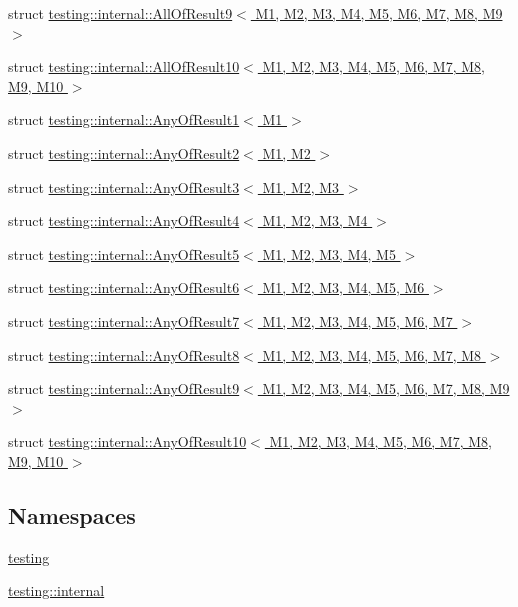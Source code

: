 \begin{DoxyCompactItemize}
\item 
struct \hyperlink{structtesting_1_1internal_1_1AllOfResult9}{testing\+::internal\+::\+All\+Of\+Result9$<$ M1, M2, M3, M4, M5, M6, M7, M8, M9 $>$}
\item 
struct \hyperlink{structtesting_1_1internal_1_1AllOfResult10}{testing\+::internal\+::\+All\+Of\+Result10$<$ M1, M2, M3, M4, M5, M6, M7, M8, M9, M10 $>$}
\item 
struct \hyperlink{structtesting_1_1internal_1_1AnyOfResult1}{testing\+::internal\+::\+Any\+Of\+Result1$<$ M1 $>$}
\item 
struct \hyperlink{structtesting_1_1internal_1_1AnyOfResult2}{testing\+::internal\+::\+Any\+Of\+Result2$<$ M1, M2 $>$}
\item 
struct \hyperlink{structtesting_1_1internal_1_1AnyOfResult3}{testing\+::internal\+::\+Any\+Of\+Result3$<$ M1, M2, M3 $>$}
\item 
struct \hyperlink{structtesting_1_1internal_1_1AnyOfResult4}{testing\+::internal\+::\+Any\+Of\+Result4$<$ M1, M2, M3, M4 $>$}
\item 
struct \hyperlink{structtesting_1_1internal_1_1AnyOfResult5}{testing\+::internal\+::\+Any\+Of\+Result5$<$ M1, M2, M3, M4, M5 $>$}
\item 
struct \hyperlink{structtesting_1_1internal_1_1AnyOfResult6}{testing\+::internal\+::\+Any\+Of\+Result6$<$ M1, M2, M3, M4, M5, M6 $>$}
\item 
struct \hyperlink{structtesting_1_1internal_1_1AnyOfResult7}{testing\+::internal\+::\+Any\+Of\+Result7$<$ M1, M2, M3, M4, M5, M6, M7 $>$}
\item 
struct \hyperlink{structtesting_1_1internal_1_1AnyOfResult8}{testing\+::internal\+::\+Any\+Of\+Result8$<$ M1, M2, M3, M4, M5, M6, M7, M8 $>$}
\item 
struct \hyperlink{structtesting_1_1internal_1_1AnyOfResult9}{testing\+::internal\+::\+Any\+Of\+Result9$<$ M1, M2, M3, M4, M5, M6, M7, M8, M9 $>$}
\item 
struct \hyperlink{structtesting_1_1internal_1_1AnyOfResult10}{testing\+::internal\+::\+Any\+Of\+Result10$<$ M1, M2, M3, M4, M5, M6, M7, M8, M9, M10 $>$}
\end{DoxyCompactItemize}
\subsection*{Namespaces}
\begin{DoxyCompactItemize}
\item 
 \hyperlink{namespacetesting}{testing}
\item 
 \hyperlink{namespacetesting_1_1internal}{testing\+::internal}
\end{DoxyCompactItemize}
